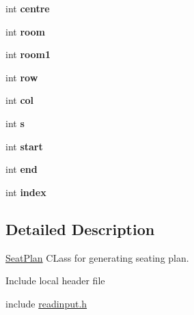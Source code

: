 \begin{DoxyCompactItemize}
\item 
\hypertarget{classSeatPlan_a55052a9b7a637609f439a003b0957552}{int {\bfseries centre}}\label{classSeatPlan_a55052a9b7a637609f439a003b0957552}

\item 
\hypertarget{classSeatPlan_ab01207ceddc85e4535874e2db71e36e3}{int {\bfseries room}}\label{classSeatPlan_ab01207ceddc85e4535874e2db71e36e3}

\item 
\hypertarget{classSeatPlan_a0b1f1e5086e938c3f484bbec62ff0dff}{int {\bfseries room1}}\label{classSeatPlan_a0b1f1e5086e938c3f484bbec62ff0dff}

\item 
\hypertarget{classSeatPlan_afcff743dbcb0e5c364cac4570730ad25}{int {\bfseries row}}\label{classSeatPlan_afcff743dbcb0e5c364cac4570730ad25}

\item 
\hypertarget{classSeatPlan_a959c1e5ee849ea93b5f46a98d4f45060}{int {\bfseries col}}\label{classSeatPlan_a959c1e5ee849ea93b5f46a98d4f45060}

\item 
\hypertarget{classSeatPlan_a31abf30876cae554e4a11f3b4892a93c}{int {\bfseries s}}\label{classSeatPlan_a31abf30876cae554e4a11f3b4892a93c}

\item 
\hypertarget{classSeatPlan_a03348c2da937f350737d7039dbd80cc8}{int {\bfseries start}}\label{classSeatPlan_a03348c2da937f350737d7039dbd80cc8}

\item 
\hypertarget{classSeatPlan_ade0c58a66a04c9f90803dee62954e15f}{int {\bfseries end}}\label{classSeatPlan_ade0c58a66a04c9f90803dee62954e15f}

\item 
\hypertarget{classSeatPlan_a2c85aa97b3681f2ba5e27af197836b26}{int {\bfseries index}}\label{classSeatPlan_a2c85aa97b3681f2ba5e27af197836b26}

\end{DoxyCompactItemize}


\subsection{Detailed Description}
\hyperlink{classSeatPlan}{Seat\-Plan} C\-Lass for generating seating plan. 

Include local header file

include \hyperlink{readinput_8h}{readinput.\-h}

